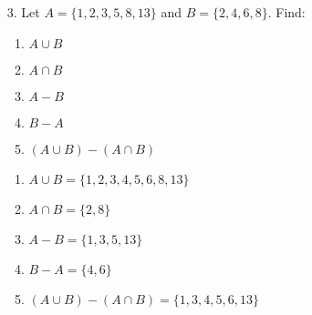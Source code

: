 \begin{enumerate}

    \item[3.]    
    Let $A = \{1, 2, 3, 5, 8, 13\}$ and $B = \{2, 4, 6, 8\}$. Find:
    \begin{enumerate}
        \item $A \cup B$
        \item $A \cap B$
        \item $A - B$
        \item $B - A$
        \item $(A \cup B) - (A \cap B)$
    \end{enumerate}
    \begin{solution}
        \begin{center}\end{center}
        \begin{enumerate}
            \item $A \cup B = \{
                1, 2, 3, 4, 5, 6, 8, 13
            \}$
            \item $A \cap B = \{
                2,8
            \}$
            \item $A - B = \{
                1, 3, 5, 13
            \}$
            \item $B - A = \{
                4, 6
            \}$
            \item $(A \cup B) - (A \cap B) = \{
                1, 3, 4, 5, 6, 13
            \}$
        \end{enumerate}
    \end{solution}

\end{enumerate}
